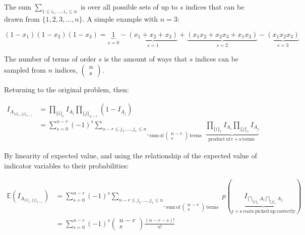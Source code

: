 The sum $\sum_{1\leq i_1,...,i_s\leq n}$ is over all possible sets of up to $s$ indices that can be drawn from $\{1,2,3,...,n\}$. A simple example with $n=3$:

\begin{equation}
(1-x_1)(1-x_2)(1-x_3) = \underbrace{1}_{s=0} - \underbrace{(x_1 + x_2 + x_3)}_{s=1} + \underbrace{(x_1x_2 + x_2x_3 + x_1x_3)}_{s=2} - \underbrace{(x_1x_2x_3)}_{s=3}
\end{equation}

The number of terms of order $s$ is the amount of ways that $s$ indices can be sampled from $n$ indices, $\left(\begin{array}{l}n\\s\end{array}\right)$.

Returning to the original problem, then:

\begin{equation}
\begin{array}{ll}
I_{A_{\{i\}_r,\{j\}_{n-r}}} &= \prod_{\{i\}_r}I_{A_i}\prod_{\{j\}_{n-r}}(1-I_{A_j})\\
&=\sum_{s=0}^{n-r} (-1)^s \underbrace{\sum_{n-r\leq j_1,...,j_s\leq n}}_{\mathrm{sum\ of\ }\left(\begin{array}{l}n-r\\s\end{array}\right)\mathrm{\ terms\ \ }} \underbrace{\prod_{\{i\}_r} I_{A_i}\prod_{\{j\}_s}I_{A_j}}_{\mathrm{product\ of\ r+s\ terms\ \ }}
\end{array}
\end{equation}

By linearity of expected value, and using the relationship of the expected value of indicator variables to their probabilities:

\begin{equation}
\begin{array}{rl}
\mathbb{E}(I_{A_{\{i\}_r,\{j\}_{n-r}}}) &= \sum_{s=0}^{n-r} (-1)^s \underbrace{\sum_{n-r\leq j_1,...,j_s\leq n}}_{\mathrm{sum\ of\ }\left(\begin{array}{l}n-r\\s\end{array}\right)\mathrm{\ terms\ \ }} p\left(\underbrace{I_{\bigcap_{\{i\}_r}A_i\bigcap_{\{j\}_s}A_j}}_{\mathrm{r+s\ coats\ picked\ up\ correctly}}\right)\\
&=\sum_{s=0}^{n-r} (-1)^s \left(\begin{array}{c}n-r\\s\end{array}\right)\frac{(n-r-s)!}{n!}
\end{array}
\end{equation}

